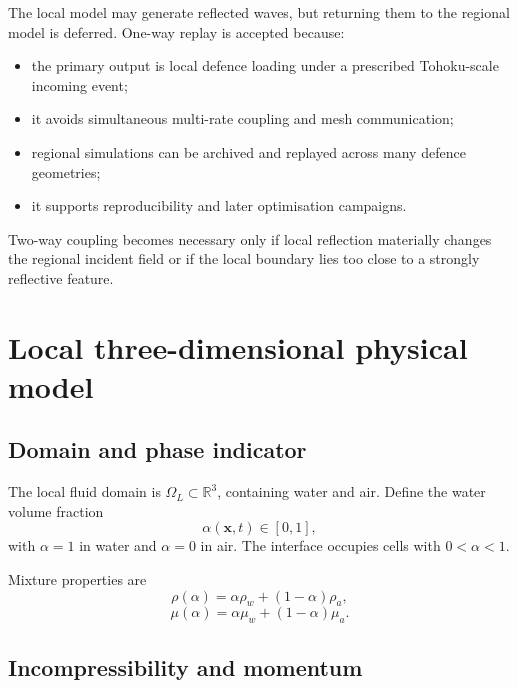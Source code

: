 \documentclass[11pt,a4paper]{article}
\newcommand{\vect}[1]{\bm{#1}}
\begin{document}
The local model may generate reflected waves, but returning them to the regional model is deferred. One-way replay is accepted because:
\begin{itemize}
  \item the primary output is local defence loading under a prescribed Tohoku-scale incoming event;
  \item it avoids simultaneous multi-rate coupling and mesh communication;
  \item regional simulations can be archived and replayed across many defence geometries;
  \item it supports reproducibility and later optimisation campaigns.
\end{itemize}
Two-way coupling becomes necessary only if local reflection materially changes the regional incident field or if the local boundary lies too close to a strongly reflective feature.

\section{Local three-dimensional physical model}

\subsection{Domain and phase indicator}

The local fluid domain is $\Omega_L\subset\mathbb R^3$, containing water and air. Define the water volume fraction
\begin{equation}
  \alpha(\vect x,t)\in[0,1],
\end{equation}
with $\alpha=1$ in water and $\alpha=0$ in air. The interface occupies cells with $0<\alpha<1$.

Mixture properties are
\begin{equation}
  \rho(\alpha)=\alpha\rho_w+(1-\alpha)\rho_a,
\end{equation}
\begin{equation}
  \mu(\alpha)=\alpha\mu_w+(1-\alpha)\mu_a.
\end{equation}

\subsection{Incompressibility and momentum}
\end{document}
